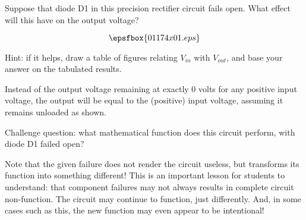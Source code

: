 

Suppose that diode D1 in this precision rectifier circuit fails open.  What effect will this have on the output voltage?

$$\epsfbox{01174x01.eps}$$

Hint: if it helps, draw a table of figures relating $V_{in}$ with $V_{out}$, and base your answer on the tabulated results.







Instead of the output voltage remaining at exactly 0 volts for any positive input voltage, the output will be equal to the (positive) input voltage, assuming it remains unloaded as shown.

\vskip 10pt

Challenge question: what mathematical function does this circuit perform, with diode D1 failed open?







Note that the given failure does not render the circuit useless, but transforms its function into something different!  This is an important lesson for students to understand: that component failures may not always results in complete circuit non-function.  The circuit may continue to function, just differently.  And, in some cases such as this, the new function may even appear to be intentional!




